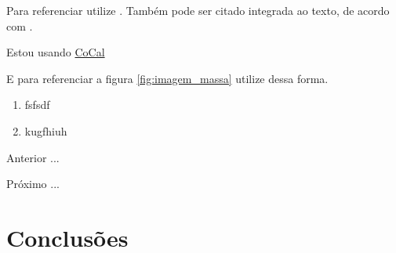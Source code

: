 

Para referenciar utilize \cite{ninguem2022curioso}. Também pode ser citado integrada ao texto, de acordo com .


\par Estou usando \href {https://cocalc.com/} {CoCal}

E para referenciar a figura \ref{fig:imagem_massa} utilize dessa forma.


\begin{enumerate}[label=\Roman{*}, ref=(\roman{*})]
  \item fsfsdf
  \item kugfhiuh
\end{enumerate}

\begin{asparaenum}
\item Anterior ... \cite{ninguem2022curioso}
\item Próximo ... \label{pl1}
\end{asparaenum}



\section{Conclusões}




